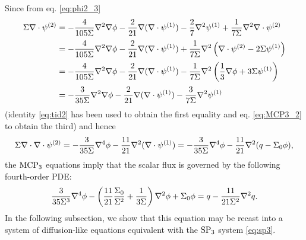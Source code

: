 Since from eq. \eqref{eq:phi2_3} 
$$
\begin{aligned}
\Sigma\div\fmom[2] &= -\frac{4}{105\Sigma}\lap\nabla\phi - \frac{2}{21}\nabla(\div\fmom[1]) - \frac{2}{7}\lap\fmom[1] + 
\frac{1}{7\Sigma}\lap\div\fmom[2]\\[.2em]
&= -\frac{4}{105\Sigma}\lap\del\phi	- \frac{2}{21}\del(\div\fmom[1]) +
\frac{1}{7\Sigma}\lap\left(\div\fmom[2]-2\Sigma\fmom[1]\right)\\[.2em]
&= -\frac{4}{105\Sigma}\lap\del\phi	- \frac{2}{21}\del(\div\fmom[1]) -
\frac{1}{7\Sigma}\lap\left(\frac{1}{3}\del\phi+3\Sigma\fmom[1]\right)\\[.2em]
&= -\frac{3}{35\Sigma}\lap\del\phi	- \frac{2}{21}\del(\div\fmom[1]) -
\frac{3}{7\Sigma}\lap\fmom[1]
\end{aligned}
$$
(identity \eqref{eq:tid2} has been used to obtain the first equality and eq. \eqref{eq:MCP3_2} to obtain the third) and
hence 
$$ \Sigma\div\div\fmom[2] = -\frac{3}{35\Sigma}\del^4\phi-\frac{11}{21}\lap(\del\cdot\fmom[1])
	= -\frac{3}{35\Sigma}\del^4\phi-\frac{11}{21}\lap(q - \Sigma_0\phi),
$$
the $\MCPN[3]$ equations imply that the scalar flux is governed by the following fourth-order PDE:
\begin{equation}\label{eq:scfl}
	\frac{3}{35\Sigma^3}\del^4\phi - \left(\frac{11}{21}\frac{\Sigma_0}{\Sigma^2}+\frac{1}{3\Sigma}\right)\lap\phi +
	\Sigma_0\phi = q - \frac{11}{21\Sigma^2}\lap q.
\end{equation}
In the following subsection, we show that this equation may be recast into a system of diffusion-like equations equivalent
with the $\SPN[3]$ system \eqref{eq:sp3}.

